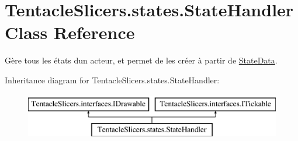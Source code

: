 \hypertarget{class_tentacle_slicers_1_1states_1_1_state_handler}{}\section{Tentacle\+Slicers.\+states.\+State\+Handler Class Reference}
\label{class_tentacle_slicers_1_1states_1_1_state_handler}


Gère tous les états d\textquotesingle{}un acteur, et permet de les créer à partir de \hyperlink{class_tentacle_slicers_1_1states_1_1_state_data}{State\+Data}.  


Inheritance diagram for Tentacle\+Slicers.\+states.\+State\+Handler\+:\begin{figure}[H]
\begin{center}
\leavevmode
\includegraphics[height=2.000000cm]{class_tentacle_slicers_1_1states_1_1_state_handler}
\end{center}
\end{figure}
